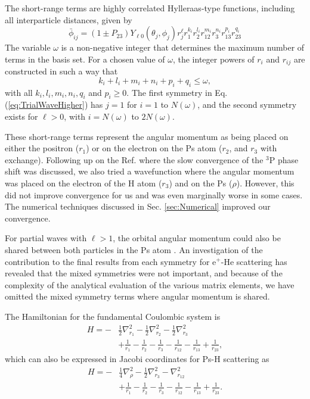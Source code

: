 \documentclass[preprint,showpacs,preprintnumbers,amsmath,amssymb,longbibliography,pra,aps]{revtex4-1}
\begin{document}
The short-range terms are highly correlated Hylleraas-type functions, including all interparticle distances, given by
\begin{equation}
\label{eq:PhiDef}
\bar{\phi}_{ij} = \left(1 \pm P_{23}\right) Y_{\ell 0}(\theta_j,\phi_j) r_j^{\ell} r_1^{k_i} r_2^{l_i} r_{12}^{m_i} r_3^{n_i} r_{13}^{p_i} r_{23}^{q_i}
\end{equation}
The variable $\omega$ is a non-negative integer that determines the maximum number of terms in the basis set. For a chosen value of $\omega$, the integer powers of $r_i$ and $r_{ij}$ are constructed in such a way that 
\begin{equation}
k_i + l_i + m_i + n_i + p_i + q_i \leq \omega,
\end{equation}
with all $k_i, l_i, m_i, n_i, q_i$ and $p_i \geq 0$.
The first symmetry in Eq. (\ref{eq:TrialWaveHigher}) has $j=1$ for $i=1$ to $N(\omega)$, and the second symmetry exists for $\ell > 0$, with $i = N(\omega)$ to $2N(\omega)$.

These short-range terms represent the angular momentum as being placed on either the positron ($r_1$) or on the electron on the Ps atom ($r_2$, and $r_3$ with exchange). Following up on the Ref. \cite{VanReeth2004} where the slow convergence of the $^3$P phase shift was discussed, we also tried a wavefunction where the angular momentum was placed on the electron of the H atom ($r_3$) and on the Ps ($\rho$). However, this did not improve convergence for us and was even marginally worse in some cases. The numerical techniques discussed in Sec. \ref{sec:Numerical} improved our convergence.

For partial waves with $\ell>1$, the orbital angular momentum could also be shared between both particles in the Ps atom \cite{Schwartz1961a}. An investigation of the contribution to the final results from each symmetry for e$^+$-He scattering \cite{VanReeth1997} has revealed that the mixed symmetries were not important, and because of the complexity of the analytical evaluation of the various matrix elements, we have omitted the mixed symmetry terms where angular momentum is shared.

The Hamiltonian for the fundamental Coulombic system is
\begin{align}
H = -&\frac{1}{2} \nabla_{r_1}^2 - \frac{1}{2} \nabla_{r_2}^2 - \frac{1}{2} \nabla_{r_3}^2  \nonumber \\
&+ \frac {1}{r_1}-\frac {1}{r_2}-\frac {1}{r_3}-\frac {1}{r_{12}}-\frac {1}{r_{13}}+\frac {1}{r_{23}},
\label{eq:Hamiltonian1}
\end{align}
which can also be expressed in Jacobi coordinates for Ps-H scattering as
\begin{align}
H = -&\frac{1}{4} \nabla_{\rho}^2 - \frac{1}{2} \nabla_{r_3}^2 - \nabla_{r_{12}}^2  \nonumber \\
&+ \frac {1}{r_1}-\frac {1}{r_2}-\frac {1}{r_3}-\frac {1}{r_{12}}-\frac {1}{r_{13}}+\frac {1}{r_{23}}.
\label{eq:Hamiltonian2}
\end{align}
\end{document}
